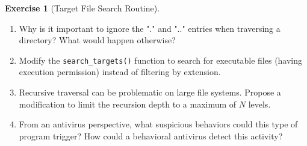 \documentclass[a4paper,11pt]{article}
\theoremstyle{plain}
\theoremstyle{definition}
\newtheorem{exercice}{Exercise}
\begin{document}
\begin{exercice}[Target File Search Routine]
\begin{enumerate}
\item Why is it important to ignore the "." and ".." entries when traversing a directory? What would happen otherwise?

\item Modify the \texttt{search\_targets()} function to search for executable files (having execution permission) instead of filtering by extension.

\item Recursive traversal can be problematic on large file systems. Propose a modification to limit the recursion depth to a maximum of $N$ levels.

\item From an antivirus perspective, what suspicious behaviors could this type of program trigger? How could a behavioral antivirus detect this activity?
\end{enumerate}

\end{exercice}
\end{document}
